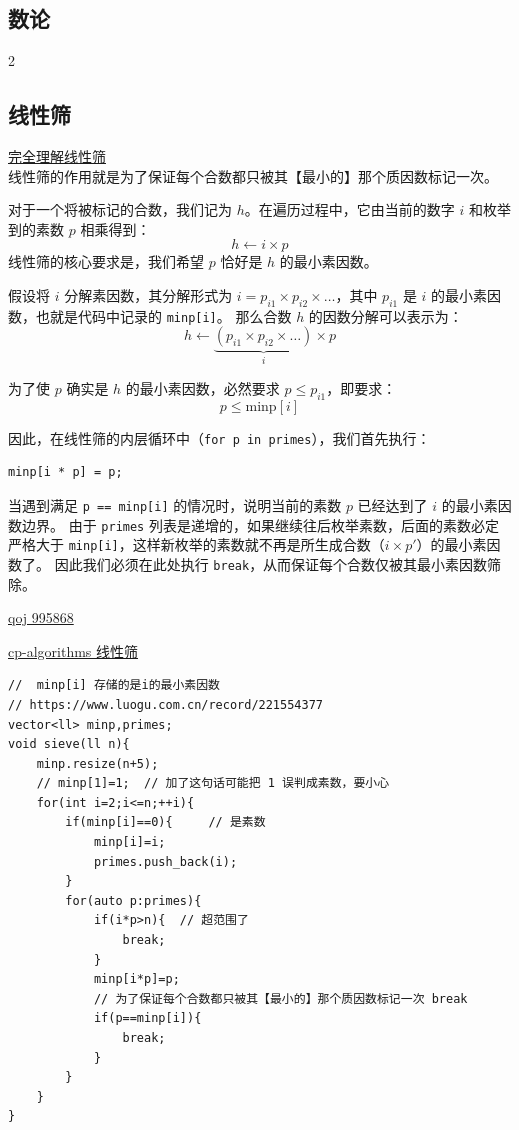 	\begin{center}
		\section{数论}
	\end{center}

	\begin{multicols*}{2} %

		\subsection{线性筛}

		\href{https://www.notion.so/3224539447bd8073af5bddda3976d8ca?pvs=21}{完全理解线性筛} \\

		线性筛的作用就是为了保证每个合数都只被其【最小的】那个质因数标记一次。

		对于一个将被标记的合数，我们记为 $h$。在遍历过程中，它由当前的数字 $i$ 和枚举到的素数 $p$ 相乘得到：
		$$ h \leftarrow i \times p $$
		线性筛的核心要求是，我们希望 $p$ 恰好是 $h$ 的最小素因数。

		假设将 $i$ 分解素因数，其分解形式为 $i = p_{i1} \times p_{i2} \times \dots$，其中 $p_{i1}$ 是 $i$ 的最小素因数，也就是代码中记录的 \verb|minp[i]|。
		那么合数 $h$ 的因数分解可以表示为：
		$$ h \leftarrow \underbrace{(p_{i1} \times p_{i2} \times \dots)}_{i} \times p $$

		为了使 $p$ 确实是 $h$ 的最小素因数，必然要求 $p \le p_{i1}$，即要求：
		$$ p \le \text{minp}[i] $$

		因此，在线性筛的内层循环中（\verb|for p in primes|），我们首先执行：
		\begin{verbatim}
minp[i * p] = p;
		\end{verbatim}

		当遇到满足 \verb|p == minp[i]| 的情况时，说明当前的素数 $p$ 已经达到了 $i$ 的最小素因数边界。
		由于 \verb|primes| 列表是递增的，如果继续往后枚举素数，后面的素数必定严格大于 \verb|minp[i]|，这样新枚举的素数就不再是所生成合数（$i \times p'$）的最小素因数了。
		因此我们必须在此处执行 \verb|break|，从而保证每个合数仅被其最小素因数筛除。

		\href{https://qoj.ac/submission/995868}{qoj 995868}

		\href{https://cp-algorithms.com/algebra/prime-sieve-linear.html}{cp-algorithms 线性筛}

		\begin{verbatim}
//  minp[i] 存储的是i的最小素因数
// https://www.luogu.com.cn/record/221554377
vector<ll> minp,primes;
void sieve(ll n){
	minp.resize(n+5);
	// minp[1]=1;  // 加了这句话可能把 1 误判成素数，要小心
	for(int i=2;i<=n;++i){
		if(minp[i]==0){		// 是素数
			minp[i]=i;
			primes.push_back(i);
		}
		for(auto p:primes){
			if(i*p>n){	// 超范围了
				break;
			}
			minp[i*p]=p;
			// 为了保证每个合数都只被其【最小的】那个质因数标记一次 break
			if(p==minp[i]){
				break;
			}
		}
	}
}


\end{verbatim}
\end{multicols*}
